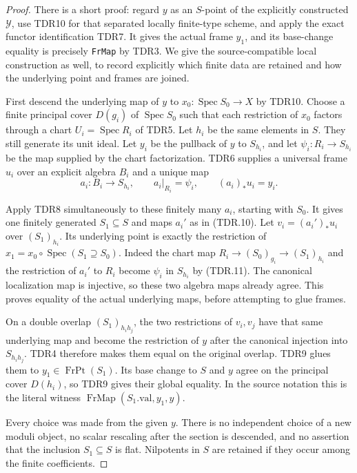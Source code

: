 \documentclass[11pt,a4paper]{article}
\numberwithin{equation}{section}
\theoremstyle{remark}\newtheorem{remark}[theorem]{Remark}
\begin{document}
\begin{proof}
There is a short proof: regard \(y\) as an \(S\)-point of
the explicitly constructed \(\mathcal Y\), use TDR10 for that
separated locally finite-type scheme, and apply the exact functor
identification TDR7.  It gives the actual frame \(y_1\), and
its base-change equality is precisely \texttt{Fr\allowbreak Map} by TDR3.
We give the source-compatible local construction as well, to
record explicitly which finite data are retained and how the
underlying point and frames are joined.

First descend the underlying map of \(y\) to
\(x_0:\operatorname{Spec}S_0\to X\) by TDR10.
Choose a finite principal cover \(D(g_i)\) of
\(\operatorname{Spec}S_0\) such that each restriction of
\(x_0\) factors through a chart \(U_i=\operatorname{Spec}R_i\)
of TDR5.  Let \(h_i\) be the same elements in \(S\).
They still generate its unit ideal.  Let \(y_i\) be the
pullback of \(y\) to \(S_{h_i}\), and let
\(\psi_i:R_i\to S_{h_i}\) be the map supplied by the chart
factorization.  TDR6 supplies a universal frame \(u_i\) over
an explicit algebra \(B_i\) and a unique map
\[
 a_i:B_i\to S_{h_i},\qquad
 a_i|_{R_i}=\psi_i,\qquad(a_i)_*u_i=y_i.                   \tag{TDR.11}
\]

Apply TDR8 simultaneously to these finitely many \(a_i\),
starting with \(S_0\).  It gives one finitely generated
\(S_1\subseteq S\) and maps \(a_i'\) as in (TDR.10).
Let \(v_i=(a_i')_*u_i\) over \((S_1)_{h_i}\).
Its underlying point is exactly the restriction of
\(x_1=x_0\circ\operatorname{Spec}(S_1\supseteq S_0)\).
Indeed the chart map
\(R_i\to(S_0)_{g_i}\to(S_1)_{h_i}\) and the restriction
of \(a_i'\) to \(R_i\) become \(\psi_i\) in \(S_{h_i}\)
by (TDR.11).  The canonical localization map is injective,
so these two algebra maps already agree.  This proves equality
of the actual underlying maps, before attempting to glue frames.

On a double overlap \((S_1)_{h_i h_j}\), the two restrictions
of \(v_i,v_j\) have that same underlying map and become the
restriction of \(y\) after the canonical injection into
\(S_{h_i h_j}\).  TDR4 therefore makes them equal on the
original overlap.  TDR9 glues them to
\(y_1\in\operatorname{FrPt}(S_1)\).  Its base change to
\(S\) and \(y\) agree on the principal cover \(D(h_i)\),
so TDR9 gives their global equality.  In the source notation this
is the literal witness
\(\operatorname{FrMap}(S_1.\mathrm{val},y_1,y)\).

Every choice was made from the given \(y\).  There is no
independent choice of a new moduli object, no scalar rescaling
after the section is descended, and no assertion that the
inclusion \(S_1\subseteq S\) is flat.  Nilpotents in \(S\)
are retained if they occur among the finite coefficients.
\end{proof}
\end{document}
